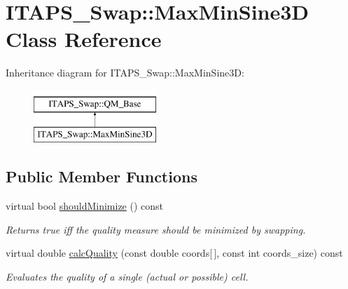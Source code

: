 \hypertarget{class_i_t_a_p_s___swap_1_1_max_min_sine3_d}{
\section{ITAPS\_\-Swap::MaxMinSine3D Class Reference}
\label{class_i_t_a_p_s___swap_1_1_max_min_sine3_d}
}
Inheritance diagram for ITAPS\_\-Swap::MaxMinSine3D:\begin{figure}[H]
\begin{center}
\leavevmode
\includegraphics[height=2cm]{class_i_t_a_p_s___swap_1_1_max_min_sine3_d}
\end{center}
\end{figure}
\subsection*{Public Member Functions}
\begin{DoxyCompactItemize}
\item 
\hypertarget{class_i_t_a_p_s___swap_1_1_max_min_sine3_d_a327f610a8d16c81434b6e0af19640cd1}{
virtual bool \hyperlink{class_i_t_a_p_s___swap_1_1_max_min_sine3_d_a327f610a8d16c81434b6e0af19640cd1}{shouldMinimize} () const }
\label{class_i_t_a_p_s___swap_1_1_max_min_sine3_d_a327f610a8d16c81434b6e0af19640cd1}

\begin{DoxyCompactList}\small\item\em Returns true iff the quality measure should be minimized by swapping. \item\end{DoxyCompactList}\item 
virtual double \hyperlink{class_i_t_a_p_s___swap_1_1_max_min_sine3_d_a4856dd6b9712f90d6327f1c651b90471}{calcQuality} (const double coords\mbox{[}$\,$\mbox{]}, const int coords\_\-size) const 
\begin{DoxyCompactList}\small\item\em Evaluates the quality of a single (actual or possible) cell. \item\end{DoxyCompactList}\end{DoxyCompactItemize}


